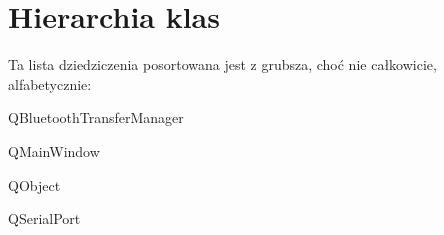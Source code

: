 \section{Hierarchia klas}
Ta lista dziedziczenia posortowana jest z grubsza, choć nie całkowicie, alfabetycznie\+:\begin{DoxyCompactList}
\item {}
\item Q\+Bluetooth\+Transfer\+Manager\begin{DoxyCompactList}
\item {}
\end{DoxyCompactList}
\item Q\+Main\+Window\begin{DoxyCompactList}
\item {}
\end{DoxyCompactList}
\item Q\+Object\begin{DoxyCompactList}
\item {}
\item {}
\item {}
\item {}
\item {}
\item {}
\end{DoxyCompactList}
\item Q\+Serial\+Port\begin{DoxyCompactList}
\item {}
\end{DoxyCompactList}
\end{DoxyCompactList}
